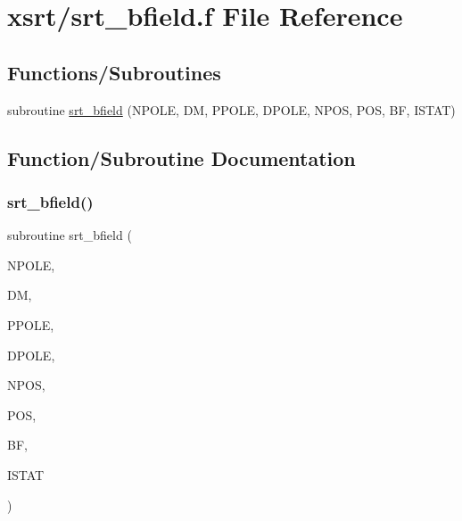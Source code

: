 \hypertarget{srt__bfield_8f}{}\section{xsrt/srt\+\_\+bfield.f File Reference}
\label{srt__bfield_8f}
\subsection*{Functions/\+Subroutines}
\begin{DoxyCompactItemize}
\item 
subroutine \hyperlink{srt__bfield_8f_ae6dd105f87156c2372285c6fbad0ab12}{srt\+\_\+bfield} (N\+P\+O\+LE, DM, P\+P\+O\+LE, D\+P\+O\+LE, N\+P\+OS, P\+OS, BF, I\+S\+T\+AT)
\end{DoxyCompactItemize}


\subsection{Function/\+Subroutine Documentation}
\mbox{\label{srt__bfield_8f_ae6dd105f87156c2372285c6fbad0ab12}} 
\subsubsection{\texorpdfstring{srt\+\_\+bfield()}{srt\_bfield()}}
{\footnotesize\ttfamily subroutine srt\+\_\+bfield (\begin{DoxyParamCaption}\item[{integer}]{N\+P\+O\+LE,  }\item[{double precision, dimension(npole)}]{DM,  }\item[{double precision, dimension(3,npole)}]{P\+P\+O\+LE,  }\item[{double precision, dimension(3,npole)}]{D\+P\+O\+LE,  }\item[{integer}]{N\+P\+OS,  }\item[{double precision, dimension(3,npos)}]{P\+OS,  }\item[{double precision, dimension(3,npos)}]{BF,  }\item[{integer}]{I\+S\+T\+AT }\end{DoxyParamCaption})}

